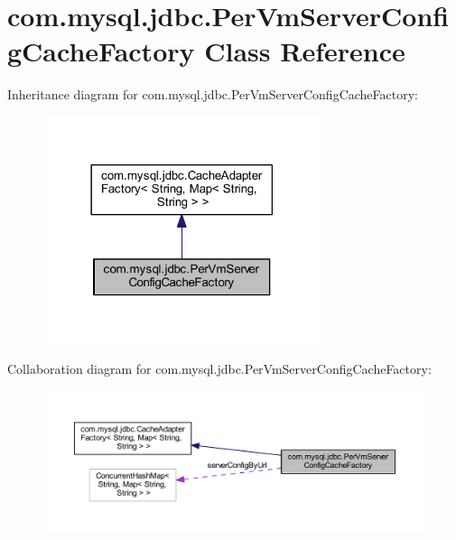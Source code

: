 \hypertarget{classcom_1_1mysql_1_1jdbc_1_1_per_vm_server_config_cache_factory}{}\section{com.\+mysql.\+jdbc.\+Per\+Vm\+Server\+Config\+Cache\+Factory Class Reference}
\label{classcom_1_1mysql_1_1jdbc_1_1_per_vm_server_config_cache_factory}


Inheritance diagram for com.\+mysql.\+jdbc.\+Per\+Vm\+Server\+Config\+Cache\+Factory\+:
\nopagebreak
\begin{figure}[H]
\begin{center}
\leavevmode
\includegraphics[width=230pt]{classcom_1_1mysql_1_1jdbc_1_1_per_vm_server_config_cache_factory__inherit__graph}
\end{center}
\end{figure}


Collaboration diagram for com.\+mysql.\+jdbc.\+Per\+Vm\+Server\+Config\+Cache\+Factory\+:
\nopagebreak
\begin{figure}[H]
\begin{center}
\leavevmode
\includegraphics[width=350pt]{classcom_1_1mysql_1_1jdbc_1_1_per_vm_server_config_cache_factory__coll__graph}
\end{center}
\end{figure}
